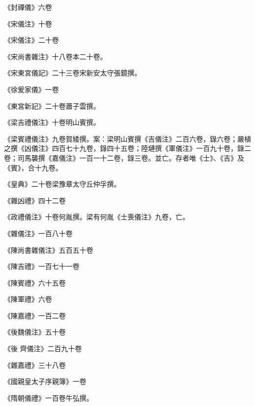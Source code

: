 \begin{pinyinscope}
 《封禪儀》六卷



 《宋儀注》十卷



 《宋儀注》二十卷



 《宋尚書雜注》十八卷本二十卷。



 《宋東宮儀記》二十三卷宋新安太守張鏡撰。



 《徐爰家儀》一卷



 《東宮新記》二十卷蕭子雲撰。



 《梁吉禮儀注》十卷明山賓撰。



 《梁賓禮儀注》九卷賀緌撰。案：梁明山賓撰《吉儀注》二百六卷，錄六卷；嚴植之撰《凶儀注》四百七十九卷，錄四十五卷；陸璉撰《軍儀注》一百九十卷，錄二卷；司馬襲撰《嘉儀注》一百一十二卷，錄三卷。並亡。存者唯《士》、《吉》及《賓》，合十九卷。



 《皇典》二十卷梁豫章太守丘仲孚撰。



 《雜凶禮》四十二卷



 《政禮儀注》十卷何胤撰。梁有何胤《士喪儀注》九卷，亡。



 《雜儀注》一百八十卷



 《陳尚書雜儀注》五百五十卷



 《陳吉禮》一百七十一卷



 《陳賓禮》六十五卷



 《陳軍禮》六卷



 《陳嘉禮》一百二卷



 《後魏儀注》五十卷



 《後
 齊儀注》二百九十卷



 《雜嘉禮》三十八卷



 《國親皇太子序親簿》一卷



 《隋朝儀禮》一百卷牛弘撰。




\end{pinyinscope}
